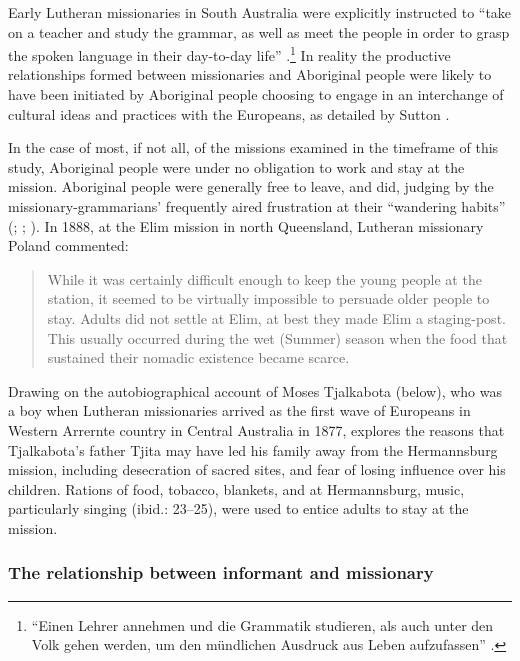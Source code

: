 Early Lutheran missionaries in South Australia were explicitly instructed to “take on a teacher and study the grammar, as well as meet the people in order to grasp the spoken language in their day-to-day life” \citep[681]{rheinwald_acta_1840}.\footnote{ ``Einen Lehrer annehmen und die Grammatik studieren, als auch unter den Volk gehen werden, um den mündlichen Ausdruck aus Leben aufzufassen'' \citep[681]{rheinwald_acta_1840}.} In reality the productive relationships formed between missionaries and Aboriginal people were likely to have been initiated by Aboriginal people choosing to engage in an interchange of cultural ideas and practices with the Europeans, as detailed by Sutton \citeyearpar[166--167, 178]{sutton_explorations_nodate}.

In the case of most, if not all, of the missions examined in the timeframe of this study, Aboriginal people were under no obligation to work and stay at the mission. Aboriginal people were generally free to leave, and did, judging by the missionary-grammarians’ frequently aired frustration at their “wandering habits” (\citealt[xi]{threlkeld_australian_1834}; \citealt[v]{meyer_vocabulary_1843}; \citealt[1]{kempe_grammar_1891}). In 1888, at the Elim mission in north Queensland, Lutheran missionary Poland commented:

\begin{quote}
    While it was certainly difficult enough to keep the young people at the station, it seemed to be virtually impossible to persuade older people to stay. Adults did not settle at Elim, at best they made Elim a staging-post. This usually occurred during the wet (Summer) season when the food that sustained their nomadic existence became scarce. \citep[16]{Poland_1998}
\end{quote}

Drawing on the autobiographical account of Moses Tjalkabota (below), who was a boy when Lutheran missionaries arrived as the first wave of Europeans in Western Arrernte country in Central Australia in 1877, \citet[25--26]{latz_2014} explores the reasons that Tjalkabota’s father Tjita may have led his family away from the Hermannsburg mission, including desecration of sacred sites, and fear of losing influence over his children. Rations of food, tobacco, blankets, and at Hermannsburg, music, particularly singing (ibid.: 23--25), were used to entice adults to stay at the mission. 

\subsubsection{The relationship between informant and missionary }
\label{sec:key:1.1.3.1}

